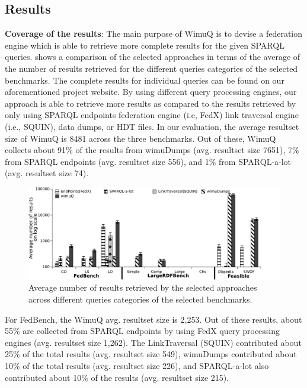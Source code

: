 \subsection{Results}
\textbf{Coverage of the results}: The main purpose of WimuQ is to devise a federation engine which is able to retrieve more complete results for the given SPARQL queries. %
 shows a comparison of the selected approaches in terms of the average of the number of results retrieved for the different queries categories of the selected benchmarks. The complete results for individual queries can be found on our aforementioned project website. By using different query processing engines, our approach is able to retrieve more results as compared to the results retrieved by only using SPARQL endpoints federation engine (i.e, FedX) link traversal engine (i.e., SQUIN), data dumps, or  HDT files. In our evaluation, the average resultset size of WimuQ is 8481 across the three benchmarks. Out of these, WimuQ collects about 91\% of the results from wimuDumps (avg. resultset size 7651), 7\% from SPARQL endpoints (avg. resultset size 556), and 1\% from SPARQL-a-lot (avg. resultset size 74). 

\begin{figure}[htb]
    \includegraphics[width=\linewidth]{img/numberRes1.pdf}
	\caption{Average number of results retrieved by the selected approaches across different queries categories of the selected benchmarks.}
	\label{fig:numberRes1}
\end{figure}

For FedBench, the WimuQ avg. resultset size is 2,253. Out of these results, about 55\% are collected from SPARQL endpoints by using FedX query processing engines (avg. resultset size 1,262). The LinkTraversal (SQUIN) contributed about 25\% of the total results (avg. resultset size 549), wimuDumps contributed about 10\% of the total results (avg. resultset size 226), and SPARQL-a-lot also contributed about 10\% of the results (avg. resultset size 215). 

